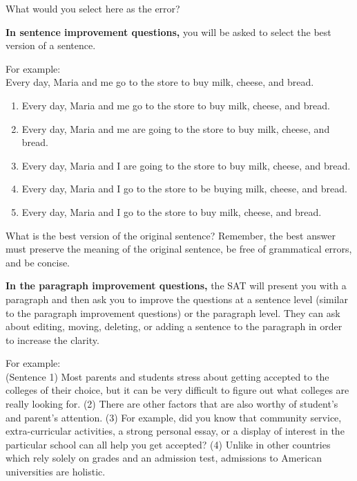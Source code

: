 What would you select here as the error?

\bigskip

\bigskip

\bigskip

\bigskip

\bigskip

\textbf{In sentence improvement questions,} you will be asked to select the best version of a sentence.

\bigskip
For example:\\
Every day, Maria and me go to the store to buy milk, cheese, and bread.
\begin{enumerate}[label=(\Alph*)] \itemsep-0.4em
\item{Every day, Maria and me go to the store to buy milk, cheese, and bread.}
\item{Every day, Maria and me are going to the store to buy milk, cheese, and bread.}
\item{Every day, Maria and I are going to the store to buy milk, cheese, and bread.}
\item{Every day, Maria and I go to the store to be buying milk, cheese, and bread.}
\item{Every day, Maria and I go to the store to buy milk, cheese, and bread.}
\end{enumerate}


\bigskip

\bigskip
What is the best version of the original sentence? Remember, the best answer must preserve the meaning of the original sentence, be free of grammatical errors, and be concise.


\bigskip

\bigskip

\bigskip

\bigskip

\bigskip

\textbf{In the paragraph improvement questions,} the SAT will present you with a paragraph and then ask you to improve the questions at a sentence level (similar to the paragraph improvement questions) or the paragraph level. They can ask about editing, moving, deleting, or adding a sentence to the paragraph in order to increase the clarity.

\bigskip
For example: \\
(Sentence 1) Most parents and students stress about getting accepted to the colleges of their choice, but it can be very difficult to figure out what colleges are really looking for. (2) There are other factors that are also worthy of student's and parent's attention. (3) For example, did you know that community service, extra-curricular activities, a strong personal essay, or a display of interest in the particular school can all help you get accepted? (4) Unlike in other countries which rely solely on grades and an admission test, admissions to American universities are holistic. 


